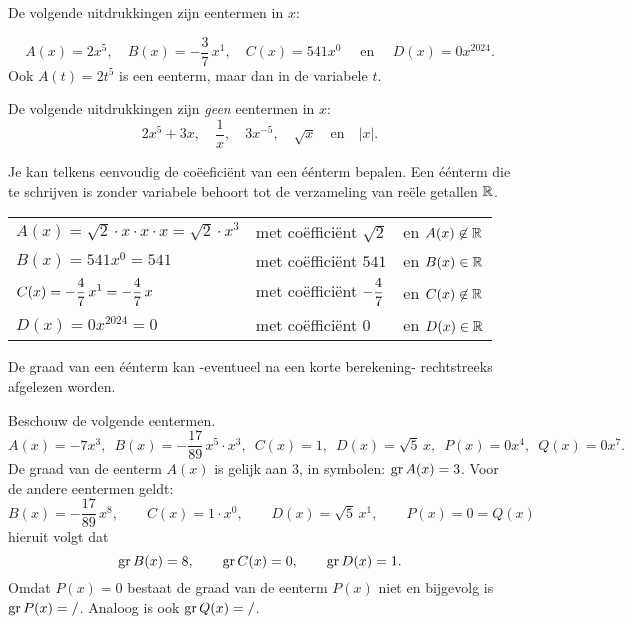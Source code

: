 \documentclass{ximera}
\begin{document}
\begin{example} 
De volgende uitdrukkingen zijn eentermen in $x$:
	
\[
A(x) = 2x^5, 
\quad B(x) = -\frac{3}{7}\,x^1, 
\quad C(x) = 541x^0 \quad \text{ en } 
\quad D(x) = 0x^{2024}.
\]
Ook $A(t) = 2t^5$ is een eenterm, maar dan in de variabele $t$. 
\end{example}

\begin{example}
De volgende uitdrukkingen zijn \textit{geen} eentermen in $x$:
\[
2x^5+3x, 
\quad \frac{1}{x}, 
\quad 3x^{-5}, 
\quad \sqrt{x} 
\quad \text{en} \quad \left|x\right|.
\] 
\end{example} 



Je kan telkens eenvoudig de coëeficiënt van een éénterm bepalen. Een éénterm die te schrijven is zonder variabele behoort tot de verzameling van reële getallen \(\mathbb{R}\). 



\begin{example} 
\begin{tabular}{lll}
 $A(x) = \sqrt{2}\cdot x \cdot x \cdot x = \sqrt{2}\cdot x^3$  & met coëfficiënt $\sqrt{2}$         & en $A(x) \not\in \mathbb{R}$ \\
 $B(x) = 541x^0 = 541$                                         & met coëfficiënt $541$              & en $B(x) \in \mathbb{R}$  \\
 $\displaystyle C(x) = -\frac{4}{7}\,x^1 = -\frac{4}{7}\,x$               & met coëfficiënt $\displaystyle -\frac{4}{7}$  & en $C(x) \not\in \mathbb{R}$ \\
 $D(x) = 0 x^{2024} = 0$                                       & met coëfficiënt $0$                & en $D(x) \in \mathbb{R}$  \\
\end{tabular}
\end{example} 


De graad van een éénterm kan -eventueel na een korte berekening- rechtstreeks afgelezen worden. 

\begin{example} 
Beschouw de volgende eentermen.
\[
A(x) = -7x^3, \,\,\, B(x) = -\frac{17}{89}\,x^5\cdot x^3, \,\,\, C(x) = 1, \,\,\, D(x) = \sqrt{5}\,x, \,\,\, P(x) = 0 x^4, \,\,\,  Q(x) = 0 x^7.
\]
De graad van de eenterm $A(x)$ is gelijk aan $3$, in symbolen: $\operatorname{gr} A(x) = 3$. 
Voor de andere eentermen geldt:  
\[
B(x) = -\frac{17}{89}\,x^8, \qquad C(x) = 1\cdot x^0, \qquad D(x) = \sqrt{5}\,x^1, \qquad P(x) = 0 = Q(x)
\]
hieruit volgt dat
\[
\operatorname{gr} B(x) = 8, \qquad \operatorname{gr} C(x) = 0, \qquad \operatorname{gr} D(x) = 1. 
\]
Omdat $P(x) = 0$ bestaat de graad van de eenterm $P(x)$ niet en bijgevolg is $\operatorname{gr} P(x) = /$. Analoog is ook $\operatorname{gr} Q(x) = /$.
\end{example} 
\end{document}
